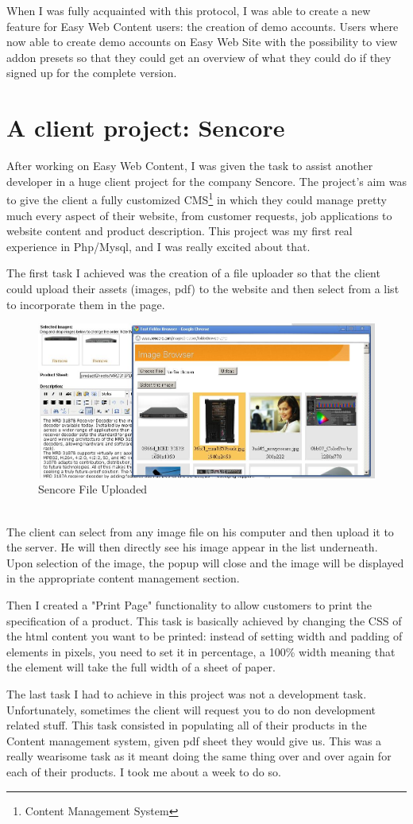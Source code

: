 When I was fully acquainted with this protocol, I was able to create a new feature for Easy Web Content users: the creation of demo accounts. Users where now able to create demo accounts on Easy Web Site with the possibility to view addon presets so that they could get an overview of what they could do if they signed up for the complete version.


\section{A client project: Sencore}
After working on Easy Web Content, I was given the task to assist another developer in a huge client project for the company Sencore. The project's aim was to give the client a fully customized CMS\footnote{Content Management System} in which they could manage pretty much every aspect of their website, from customer requests, job applications to website content and product description. This project was my first real experience in Php/Mysql, and I was really excited about that.

The first task I achieved was the creation of a file uploader so that the client could upload their assets (images, pdf) to the website and then select from a list to incorporate them in the page.
\begin{figure}[!ht]
\centering
\includegraphics[width=.55\textwidth]{img/sencore.jpg}
\caption{Sencore File Uploaded}
\label{figure:sencore_uploader}
\end{figure}
\\The client can select from any image file on his computer and then upload it to the server. He will then directly see his image appear in the list underneath. Upon selection of the image, the popup will close and the image will be displayed in the appropriate content management section.

Then I created a "Print Page" functionality to allow customers to print the specification of a product. This task is basically achieved by changing the CSS of the html content you want to be printed: instead of setting width and padding of elements in pixels, you need to set it in percentage, a 100\% width meaning that the element will take the full width of a sheet of paper.

The last task I had to achieve in this project was not a development task. Unfortunately, sometimes the client will request you to do non development related stuff. This task consisted in populating all of their products in the Content management system, given pdf sheet they would give us. This was a really wearisome task as it meant doing the same thing over and over again for each of their products. I took me about a week to do so.
